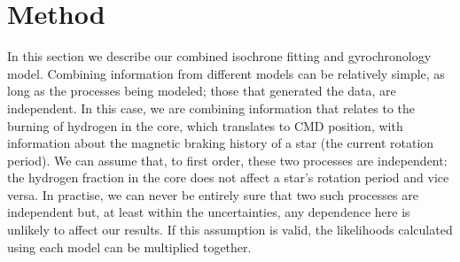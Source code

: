 \section{Method}
\label{section:method}

In this section we describe our combined isochrone fitting and gyrochronology
model.
Combining information from different models can be relatively simple, as long
as the processes being modeled; those that generated the data, are
independent.
In this case, we are combining information that relates to the burning of
hydrogen in the core, which translates to CMD position,
with information about the magnetic braking history of a star (the current
rotation period).
We can assume that, to first order, these two processes are independent: the
hydrogen fraction in the core does not affect a star's rotation period and
vice versa.  In practise,  we can never be entirely sure that two such
processes are independent but, at least within the uncertainties, any
dependence here is unlikely to affect our results.
If this assumption is valid, the likelihoods calculated using each model can
be multiplied together.

